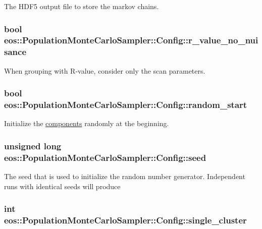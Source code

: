 \label{structeos_1_1PopulationMonteCarloSampler_1_1Config_a55d2a98f36625d31eb9117c76212771f}
The HDF5 output file to store the markov chains. \hypertarget{structeos_1_1PopulationMonteCarloSampler_1_1Config_a5e3c5e1375b04890db40b3d7581b5413}{
\subsubsection[{r\_\-value\_\-no\_\-nuisance}]{\setlength{\rightskip}{0pt plus 5cm}bool {\bf eos::PopulationMonteCarloSampler::Config::r\_\-value\_\-no\_\-nuisance}}}
\label{structeos_1_1PopulationMonteCarloSampler_1_1Config_a5e3c5e1375b04890db40b3d7581b5413}
When grouping with R-\/value, consider only the scan parameters. \hypertarget{structeos_1_1PopulationMonteCarloSampler_1_1Config_aca0e5339b634644471e1aa5cdd698231}{
\subsubsection[{random\_\-start}]{\setlength{\rightskip}{0pt plus 5cm}bool {\bf eos::PopulationMonteCarloSampler::Config::random\_\-start}}}
\label{structeos_1_1PopulationMonteCarloSampler_1_1Config_aca0e5339b634644471e1aa5cdd698231}
Initialize the \hyperlink{namespaceeos_1_1components}{components} randomly at the beginning. \hypertarget{structeos_1_1PopulationMonteCarloSampler_1_1Config_abf7b1c768e283f8a41bc8b348bb84304}{
\subsubsection[{seed}]{\setlength{\rightskip}{0pt plus 5cm}unsigned long {\bf eos::PopulationMonteCarloSampler::Config::seed}}}
\label{structeos_1_1PopulationMonteCarloSampler_1_1Config_abf7b1c768e283f8a41bc8b348bb84304}
The seed that is used to initialize the random number generator. Independent runs with identical seeds will produce \hypertarget{structeos_1_1PopulationMonteCarloSampler_1_1Config_a2a6f2098dc8be089015818326d8eb15f}{
\subsubsection[{single\_\-cluster}]{\setlength{\rightskip}{0pt plus 5cm}int {\bf eos::PopulationMonteCarloSampler::Config::single\_\-cluster}}}
